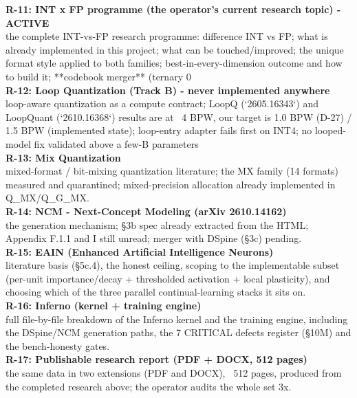 {\noindent\textbf{R-11: INT x FP programme (the operator's current research topic) - ACTIVE}\\
\noindent the complete INT-vs-FP research programme: difference INT vs FP; what is already   implemented in this project; what can be touched/improved; the unique format style applied to   both families; best-in-every-dimension outcome and how to build it; **codebook merger**   (ternary {0\\

\noindent\textbf{R-12: Loop Quantization (Track B) - never implemented anywhere}\\
\noindent loop-aware quantization as a compute contract; LoopQ (`2605.16343`) and LoopQuant   (`2610.16368`) results are at ~4 BPW, our target is 1.0 BPW (D-27) / 1.5 BPW (implemented   state); loop-entry adapter fails first on INT4; no looped-model fix validated above a few-B   parameters\\

\noindent\textbf{R-13: Mix Quantization}\\
\noindent mixed-format / bit-mixing quantization literature; the MX family (14 formats)   measured and quarantined; mixed-precision allocation already implemented in Q\_MX/Q\_G\_MX.\\

\noindent\textbf{R-14: NCM - Next-Concept Modeling (arXiv 2610.14162)}\\
\noindent the generation mechanism; §3b spec already extracted from the HTML; Appendix F.1.1   and I still unread; merger with DSpine (§3c) pending.\\

\noindent\textbf{R-15: EAIN (Enhanced Artificial Intelligence Neurons)}\\
\noindent literature basis (§5c.4), the honest ceiling, scoping to the implementable subset   (per-unit importance/decay + thresholded activation + local plasticity), and choosing which   of the three parallel continual-learning stacks it sits on.\\

\noindent\textbf{R-16: Inferno (kernel + training engine)}\\
\noindent full file-by-file breakdown of the Inferno kernel and the training engine,   including the DSpine/NCM generation paths, the 7 CRITICAL defects register (§10M) and the   bench-honesty gates.\\

\noindent\textbf{R-17: Publishable research report (PDF + DOCX, 512 pages)}\\
\noindent the same data in two extensions (PDF and DOCX), ~512 pages, produced from the   completed research above; the operator audits the whole set 3x.\\

}}
